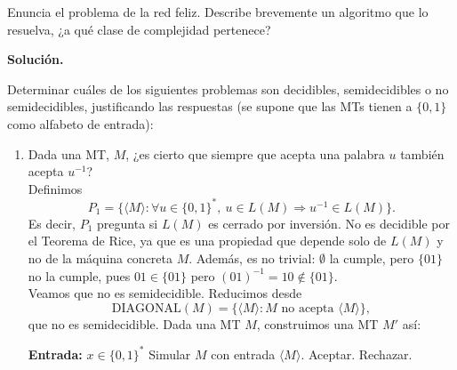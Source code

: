\documentclass[12pt]{article}
\begin{document}
    \begin{ejercicio}[1.3 puntos]
        Enuncia el problema de la red feliz. Describe brevemente un algoritmo que lo resuelva, ¿a qué clase de complejidad pertenece?
    \end{ejercicio}

    \newpage
    \setcounter{ejercicio}{0} %
    \noindent
    \textbf{Solución.}

    \begin{ejercicio}[2.4 puntos]
        Determinar cuáles de los siguientes problemas son decidibles, semidecidibles o no semidecidibles, justificando las respuestas (se supone que las MTs tienen a $\{0,1\}$ como alfabeto de entrada):
        \begin{enumerate}
            \item Dada una MT, $M$, ¿es cierto que siempre que acepta una palabra $u$ también acepta $u^{-1}$? \\
            
            Definimos
            $$
            P_1=\{\langle M\rangle : \forall u\in\{0,1\}^*,\ u\in L(M)\Rightarrow u^{-1}\in L(M)\}.
            $$
            Es decir, $P_1$ pregunta si $L(M)$ es cerrado por inversión. No es decidible por el Teorema de Rice, ya que es una propiedad 
            que depende solo de $L(M)$ y no de la máquina concreta $M$. Además, es no trivial: $\emptyset$ la cumple, pero $\{01\}$ no 
            la cumple, pues $01\in \{01\}$ pero $(01)^{-1}=10\notin \{01\}$. \\

            Veamos que no es semidecidible. Reducimos desde
            $$
            \text{DIAGONAL}(M)=\{\langle M\rangle : M \text{ no acepta } \langle M\rangle\},
            $$
            que no es semidecidible. Dada una MT $M$, construimos una MT $M'$ así:

            \begin{algorithm}
            \caption{MT $M'$}
            \begin{algorithmic}
            \State \textbf{Entrada:} $x\in\{0,1\}^*$
            \State Simular $M$ con entrada $\langle M\rangle$.
                    \State Aceptar.
                \Else
                    \State Rechazar.
                \EndIf
            \EndIf
            \end{algorithmic}
            \end{algorithm}


\end{enumerate}
\end{ejercicio}
\end{document}

